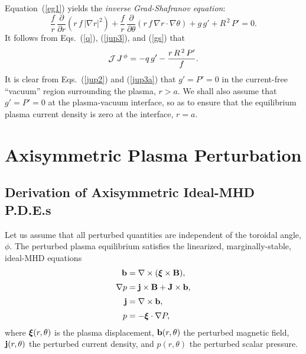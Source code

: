 \documentclass[12pt,prb,aps,notitlepage]{revtex4-1}
\newcommand {\bxi}{\mbox{\boldmath$\xi$}}
\begin{document}
Equation~(\ref{eg1}) yields the {\em inverse Grad-Shafranov equation}:
\begin{equation}\label{gs}
\frac{f}{r}\,\frac{\partial}{\partial r}\!\left(r\,f\,|\nabla r|^2\right) +\frac{f}{r}\,\frac{\partial}{\partial\theta}\!\left(r\,f\,\nabla r\cdot\nabla\theta\right)+g\,g' + R^{\,2}\,P'=0.
\end{equation}
It follows from Eqs.~(\ref{q}), (\ref{jup3}), and (\ref{gs}) that
\begin{equation}\label{jup3a}
{\cal J}\,J^{\,\phi} = -q\,g' - \frac{r\,R^{\,2}\,P'}{f}.
\end{equation}
It is clear from Eqs.~(\ref{jup2}) and (\ref{jup3a}) that $g'=P'=0$ in the  current-free ``vacuum'' region surrounding the plasma, $r>a$. 
We shall also assume that $g'=P'=0$ at the plasma-vacuum interface, so as to ensure that the equilibrium plasma
current density is zero at the interface, $r=a$. 

\section{Axisymmetric Plasma Perturbation}\label{opde}

\subsection{Derivation of Axisymmetric Ideal-MHD P.D.E.s}
Let us assume that all perturbed quantities are independent of the toroidal angle, $\phi$. 
The perturbed plasma equilibrium satisfies the  linearized, marginally-stable, ideal-MHD equations
\begin{align}
{\bf b} &= \nabla\times (\bxi\times {\bf B}),\label{e21}\\[0.5ex]
\nabla p &={\bf j}\times {\bf B}  +{\bf J}\times {\bf b},\label{e22}\\[0.5ex]
{\bf j} &= \nabla\times {\bf b},\label{e23}\\[0.5ex]
p&= -\bxi\cdot\nabla P,\label{e24}
\end{align}
where $\bxi(r,\theta)$ is the plasma displacement, ${\bf b}(r,\theta)$ the perturbed magnetic field,
${\bf j}(r,\theta)$ the perturbed current density, and $p(r,\theta)$ the perturbed scalar pressure. 
\end{document}
